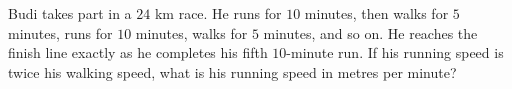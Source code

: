 Budi takes part in a $24$ km race. He runs for $10$ minutes, then walks for $5$ minutes, runs for $10$ minutes, walks for $5$ minutes, and so on. He reaches the finish line exactly as he completes his fifth $10$-minute run. If his running speed is twice his walking speed, what is his running speed in metres per minute?
